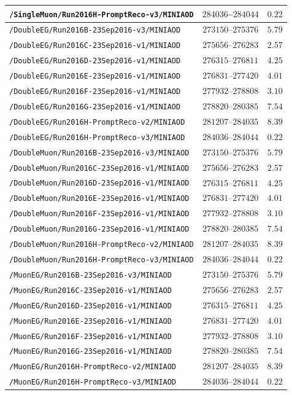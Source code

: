 \begin{landscape}
\begin{longtable}{p{4.5in}cr}
\texttt{/SingleMuon/Run2016H-PromptReco-v3/MINIAOD} & $284036$--$284044$ & $0.22$ \\
\midrule
\texttt{/DoubleEG/Run2016B-23Sep2016-v3/MINIAOD} & $273150$--$275376$ & $5.79$ \\
\texttt{/DoubleEG/Run2016C-23Sep2016-v1/MINIAOD} & $275656$--$276283$ & $2.57$ \\
\texttt{/DoubleEG/Run2016D-23Sep2016-v1/MINIAOD} & $276315$--$276811$ & $4.25$ \\
\texttt{/DoubleEG/Run2016E-23Sep2016-v1/MINIAOD} & $276831$--$277420$ & $4.01$ \\
\texttt{/DoubleEG/Run2016F-23Sep2016-v1/MINIAOD} & $277932$--$278808$ & $3.10$ \\
\texttt{/DoubleEG/Run2016G-23Sep2016-v1/MINIAOD} & $278820$--$280385$ & $7.54$ \\
\texttt{/DoubleEG/Run2016H-PromptReco-v2/MINIAOD} & $281207$--$284035$ & $8.39$ \\
\texttt{/DoubleEG/Run2016H-PromptReco-v3/MINIAOD} & $284036$--$284044$ & $0.22$ \\
\midrule
\texttt{/DoubleMuon/Run2016B-23Sep2016-v3/MINIAOD} & $273150$--$275376$ & $5.79$ \\
\texttt{/DoubleMuon/Run2016C-23Sep2016-v1/MINIAOD} & $275656$--$276283$ & $2.57$ \\
\texttt{/DoubleMuon/Run2016D-23Sep2016-v1/MINIAOD} & $276315$--$276811$ & $4.25$ \\
\texttt{/DoubleMuon/Run2016E-23Sep2016-v1/MINIAOD} & $276831$--$277420$ & $4.01$ \\
\texttt{/DoubleMuon/Run2016F-23Sep2016-v1/MINIAOD} & $277932$--$278808$ & $3.10$ \\
\texttt{/DoubleMuon/Run2016G-23Sep2016-v1/MINIAOD} & $278820$--$280385$ & $7.54$ \\
\texttt{/DoubleMuon/Run2016H-PromptReco-v2/MINIAOD} & $281207$--$284035$ & $8.39$ \\
\texttt{/DoubleMuon/Run2016H-PromptReco-v3/MINIAOD} & $284036$--$284044$ & $0.22$ \\
\midrule
\texttt{/MuonEG/Run2016B-23Sep2016-v3/MINIAOD} & $273150$--$275376$ & $5.79$ \\
\texttt{/MuonEG/Run2016C-23Sep2016-v1/MINIAOD} & $275656$--$276283$ & $2.57$ \\
\texttt{/MuonEG/Run2016D-23Sep2016-v1/MINIAOD} & $276315$--$276811$ & $4.25$ \\
\texttt{/MuonEG/Run2016E-23Sep2016-v1/MINIAOD} & $276831$--$277420$ & $4.01$ \\
\texttt{/MuonEG/Run2016F-23Sep2016-v1/MINIAOD} & $277932$--$278808$ & $3.10$ \\
\texttt{/MuonEG/Run2016G-23Sep2016-v1/MINIAOD} & $278820$--$280385$ & $7.54$ \\
\texttt{/MuonEG/Run2016H-PromptReco-v2/MINIAOD} & $281207$--$284035$ & $8.39$ \\
\texttt{/MuonEG/Run2016H-PromptReco-v3/MINIAOD} & $284036$--$284044$ & $0.22$ \\

\end{longtable}
\end{landscape}

